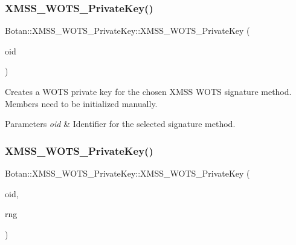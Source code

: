 \subsubsection{\texorpdfstring{X\+M\+S\+S\+\_\+\+W\+O\+T\+S\+\_\+\+Private\+Key()}{XMSS\_WOTS\_PrivateKey()}\hspace{0.1cm}{\footnotesize\ttfamily [1/5]}}
{\footnotesize\ttfamily Botan\+::\+X\+M\+S\+S\+\_\+\+W\+O\+T\+S\+\_\+\+Private\+Key\+::\+X\+M\+S\+S\+\_\+\+W\+O\+T\+S\+\_\+\+Private\+Key (\begin{DoxyParamCaption}\item[{X\+M\+S\+S\+\_\+\+W\+O\+T\+S\+\_\+\+Parameters\+::ots\+\_\+algorithm\+\_\+t}]{oid }\end{DoxyParamCaption})\hspace{0.3cm}{\ttfamily [inline]}}

Creates a W\+O\+TS private key for the chosen X\+M\+SS W\+O\+TS signature method. Members need to be initialized manually.


\begin{DoxyParams}{Parameters}
{\em oid} & Identifier for the selected signature method. \\
\hline
\end{DoxyParams}
\mbox{\label{class_botan_1_1_x_m_s_s___w_o_t_s___private_key_ab327590ef27314723fd71cfc1cdfaef2}} 
\subsubsection{\texorpdfstring{X\+M\+S\+S\+\_\+\+W\+O\+T\+S\+\_\+\+Private\+Key()}{XMSS\_WOTS\_PrivateKey()}\hspace{0.1cm}{\footnotesize\ttfamily [2/5]}}
{\footnotesize\ttfamily Botan\+::\+X\+M\+S\+S\+\_\+\+W\+O\+T\+S\+\_\+\+Private\+Key\+::\+X\+M\+S\+S\+\_\+\+W\+O\+T\+S\+\_\+\+Private\+Key (\begin{DoxyParamCaption}\item[{X\+M\+S\+S\+\_\+\+W\+O\+T\+S\+\_\+\+Parameters\+::ots\+\_\+algorithm\+\_\+t}]{oid,  }\item[{Random\+Number\+Generator \&}]{rng }\end{DoxyParamCaption})\hspace{0.3cm}{\ttfamily [inline]}}

